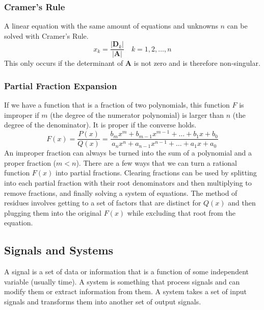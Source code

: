 \subsubsection{Cramer's Rule}
A linear equation with the same amount of equations and unknowns $n$ can be solved with Cramer's Rule.
\begin{equation}
    x_k = \frac{|\textbf{D}_k|}{|\textbf{A}|} \quad k = 1,2,\dots, n
\end{equation}
This only occurs if the determinant of \textbf{A} is not zero and is therefore non-singular.

\subsubsection{Partial Fraction Expansion}
If we have a function that is a fraction of two polynomials, this function $F$ is improper if $m$ (the degree of the numerator polynomial) is larger than $n$ (the degree of the denominator).
It is proper if the converse holds.
\begin{equation}
    F(x) = \frac{P(x)}{Q(x)} = \frac{b_m x^m + b_{m-1} x^{m-1} + \dots + b_1 x + b_0}{a_n x^n + a_{n-1} x^{n-1} + \dots + a_1 x + a_0}
\end{equation}
An improper fraction can always be turned into the sum of a polynomial and a proper fraction ($m < n$).
There are a few ways that we can turn a rational function $F(x)$ into partial fractions.
Clearing fractions can be used by splitting into each partial fraction with their root denominators and then multiplying to remove fractions, and finally solving a system of equations.
The method of residues involves getting to a set of factors that are distinct for $Q(x)$ and then plugging them into the original $F(x)$ while excluding that root from the equation.

\subsection{Signals and Systems}
A signal is a set of data or information that is a function of some independent variable (usually time).
A system is something that process signals and can modify them or extract information from them.  
A system takes a set of input signals and transforms them into another set of output signals.

